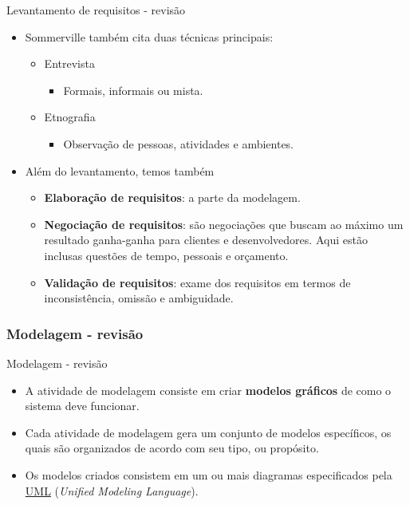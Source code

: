 \documentclass{beamer}
\begin{document}
\begin{frame}{Levantamento de requisitos - revisão}
	\begin{itemize}
		\justifying
		\item<1-3> Sommerville também cita duas técnicas principais:
			\begin{itemize}
				\item<1-3> Entrevista
					\begin{itemize}
						\justifying
						\item<2> Formais, informais ou mista.
					\end{itemize}
				\item<1-3> Etnografia
					\begin{itemize}
						\justifying
						\item<3> Observação de pessoas, atividades e ambientes.
					\end{itemize}
			\end{itemize}
		\item<4> Além do levantamento, temos também
			\begin{itemize}
				\justifying
				\item<4> \textbf{Elaboração de requisitos}: a parte da modelagem.
				\item<4> \textbf{Negociação de requisitos}: são negociações que buscam ao máximo um resultado ganha-ganha para clientes e desenvolvedores. Aqui estão inclusas questões de tempo, pessoais e orçamento.
				\item<4> \textbf{Validação de requisitos}: exame dos requisitos em termos de inconsistência, omissão e ambiguidade.
			\end{itemize}
	\end{itemize}
\end{frame}

\subsubsection{Modelagem - revisão}

\begin{frame}{Modelagem - revisão}
	\begin{itemize}
		\justifying
		\item A atividade de modelagem consiste em criar \textbf{modelos gráficos} de como o sistema deve funcionar.
		\item Cada atividade de modelagem gera um conjunto de modelos específicos, os quais são organizados de acordo com seu tipo, ou propósito.
		\item Os modelos criados consistem em um ou mais diagramas especificados pela \href{https://www.omg.org/spec/UML/2.5.1/PDF}{UML} (\textit{Unified Modeling Language}).
	\end{itemize}
\end{frame}
\end{document}
